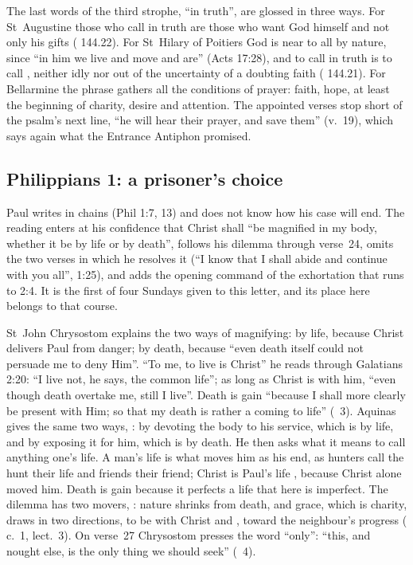 The last words of the third strophe, ``in truth'', are glossed in three ways.
For St~Augustine those who call in truth are those who want God himself and
not only his gifts ( 144.22). For St~Hilary of Poitiers God is near to all by
nature, since ``in him we live and move and are'' (Acts 17:28), and to call
in truth is to call , neither idly nor out of the uncertainty of a doubting faith
( 144.21). For Bellarmine the phrase gathers all
the conditions of prayer: faith, hope, at least the beginning of charity,
desire and attention. The appointed
verses stop short of the psalm's next line, ``he will hear their prayer, and
save them'' (v.~19), which says again what the Entrance Antiphon promised.

\subsection{Philippians 1: a prisoner's choice}

Paul writes in chains (Phil 1:7, 13) and does not know how his case will end.
The reading enters at his confidence that Christ shall ``be magnified in my
body, whether it be by life or by death'', follows his dilemma through
verse~24, omits the two verses in which he resolves it (``I know that I shall
abide and continue with you all'', 1:25), and adds the opening command of the
exhortation that runs to 2:4. It is the first of four Sundays given to this
letter, and its place here belongs to that course.

St~John Chrysostom explains the two ways of magnifying: by life, because
Christ delivers Paul from danger; by death, because ``even death itself could
not persuade me to deny Him''. ``To me, to live is Christ'' he reads through
Galatians 2:20: ``I live not, he says, the common life''; as long as Christ is
with him, ``even though death overtake me, still I live''. Death is gain
``because I shall more clearly be present with Him; so that my death is
rather a coming to life'' (~3). Aquinas gives the
same two ways, : by
devoting the body to his service, which is by life, and by exposing it for
him, which is by death. He then asks what it means to call anything one's
life. A man's life is what moves him as his end, as hunters call the hunt
their life and friends their friend; Christ is Paul's life , because Christ alone moved him. Death is gain because it
perfects a life that here is imperfect. The dilemma has two movers, : nature shrinks from
death, and grace, which is charity, draws in two directions, to be with Christ
and , toward the neighbour's progress ( c.~1, lect.~3). On verse~27 Chrysostom presses the word ``only'':
``this, and nought else, is the only thing we should seek''
(~4).

